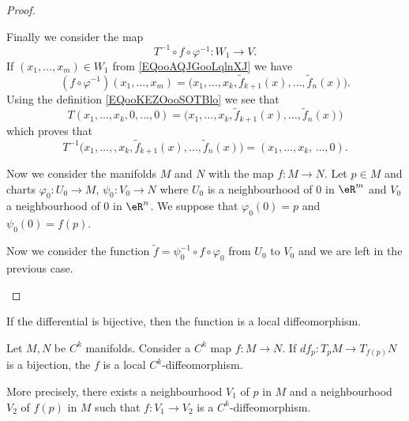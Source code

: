 \begin{proof}
\begin{subproof}
\begin{subproof}

			Finally we consider the map
			\begin{equation}
				T^{-1}\circ f\circ \varphi^{-1}\colon W_1 \to V.
			\end{equation}
			If \( (x_1,\ldots, x_m)\in W_1\) from \eqref{EQooAQJGooLqlnXJ} we have
			\begin{equation}
				(f\circ \varphi^{-1})(x_1,\ldots, x_m)=\big( x_1,\ldots, x_k,\tilde f_{k+1}(x),\ldots, \tilde f_n(x) \big).
			\end{equation}
			Using the definition \eqref{EQooKEZOooSOTBlo} we see that
			\begin{equation}
				T(x_1,\ldots, x_k,0,\ldots, 0)=\big( x_1,\ldots, x_k,\tilde f_{k+1}(x),\ldots, \tilde f_n(x) \big)
			\end{equation}
			which proves that
			\begin{equation}
				T^{-1}\big( x_1,\ldots, ,x_k,\tilde f_{k+1}(x),\ldots, \tilde f_n(x) \big)=(x_1,\ldots, x_k,\,\ldots, 0).
			\end{equation}
		\end{subproof}


		Now we consider the manifolds \( M\) and \( N\) with the map \( f\colon M\to N\). Let \( p\in M\) and charts \( \varphi_0\colon U_0\to M\), \( \psi_0\colon V_0\to N\) where \( U_0\) is a neighbourhood of \( 0\) in \( \eR^m\) and \( V_0\) a neighbourhood of \( 0\) in \( \eR^n\). We suppose that \( \varphi_0(0)=p\) and \( \psi_0(0)=f(p)\).

		Now we consider the function \( \tilde f=\psi_0^{-1}\circ f\circ \varphi_0\) from \( U_0\) to \( V_0\) and we are left in the previous case.
	\end{subproof}
\end{proof}

If the differential is bijective, then the function is a local diffeomorphism.
\begin{theorem}       \label{THOooDWEXooMClWVi}
	Let \( M,N\) be \( C^k\) manifolds. Consider a \( C^k\) map \( f\colon M\to N\). If \( df_p\colon T_pM\to T_{f(p)}N\) is a bijection, the \( f\) is a local \( C^k\)-diffeomorphism.

	More precisely, there exists a neighbourhood \( V_1\) of \( p\) in \( M\) and a neighbourhood \( V_2\) of \( f(p)\) in \( M\) such that \( f\colon V_1\to V_2\) is a \( C^k\)-diffeomorphism.

\end{theorem}

